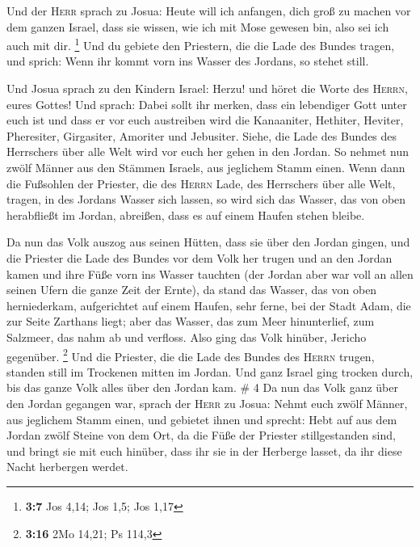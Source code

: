  Und der \textsc{Herr} sprach zu Josua: Heute will ich
anfangen, dich groß zu machen vor dem ganzen Israel, dass sie wissen,
wie ich mit Mose gewesen bin, also sei ich auch mit dir. \footnote{\textbf{3:7}
  Jos 4,14; Jos 1,5; Jos 1,17}  Und du gebiete den
Priestern, die die Lade des Bundes tragen, und sprich: Wenn ihr kommt
vorn ins Wasser des Jordans, so stehet still.

 Und Josua sprach zu den Kindern Israel: Herzu! und höret
die Worte des \textsc{Herrn}, eures Gottes!  Und sprach:
Dabei sollt ihr merken, dass ein lebendiger Gott unter euch ist und dass
er vor euch austreiben wird die Kanaaniter, Hethiter, Heviter,
Pheresiter, Girgasiter, Amoriter und Jebusiter.  Siehe,
die Lade des Bundes des Herrschers über alle Welt wird vor euch her
gehen in den Jordan.  So nehmet nun zwölf Männer aus den
Stämmen Israels, aus jeglichem Stamm einen.  Wenn dann
die Fußsohlen der Priester, die des \textsc{Herrn} Lade, des Herrschers
über alle Welt, tragen, in des Jordans Wasser sich lassen, so wird sich
das Wasser, das von oben herabfließt im Jordan, abreißen, dass es auf
einem Haufen stehen bleibe.

 Da nun das Volk auszog aus seinen Hütten, dass sie über
den Jordan gingen, und die Priester die Lade des Bundes vor dem Volk her
trugen  und an den Jordan kamen und ihre Füße vorn ins
Wasser tauchten (der Jordan aber war voll an allen seinen Ufern die
ganze Zeit der Ernte),  da stand das Wasser, das von oben
herniederkam, aufgerichtet auf einem Haufen, sehr ferne, bei der Stadt
Adam, die zur Seite Zarthans liegt; aber das Wasser, das zum Meer
hinunterlief, zum Salzmeer, das nahm ab und verfloss. Also ging das Volk
hinüber, Jericho gegenüber. \footnote{\textbf{3:16} 2Mo 14,21; Ps 114,3}
 Und die Priester, die die Lade des Bundes des
\textsc{Herrn} trugen, standen still im Trockenen mitten im Jordan. Und
ganz Israel ging trocken durch, bis das ganze Volk alles über den Jordan
kam. \# 4  Da nun das Volk ganz über den Jordan gegangen
war, sprach der \textsc{Herr} zu Josua:  Nehmt euch zwölf
Männer, aus jeglichem Stamm einen,  und gebietet ihnen und
sprecht: Hebt auf aus dem Jordan zwölf Steine von dem Ort, da die Füße
der Priester stillgestanden sind, und bringt sie mit euch hinüber, dass
ihr sie in der Herberge lasset, da ihr diese Nacht herbergen werdet.

